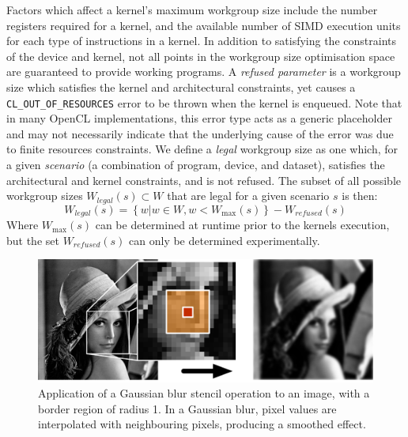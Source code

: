 \documentclass[nonatbib,preprint,9pt]{sigplanconf}
\begin{document}
Factors which affect a kernel's maximum workgroup size include the
number registers required for a kernel, and the available number of
SIMD execution units for each type of instructions in a kernel. In
addition to satisfying the constraints of the device and kernel, not
all points in the workgroup size optimisation space are guaranteed to
provide working programs. A \emph{refused parameter} is a workgroup
size which satisfies the kernel and architectural constraints, yet
causes a \texttt{CL\_OUT\_OF\_RESOURCES} error to be thrown when the
kernel is enqueued. Note that in many OpenCL implementations, this
error type acts as a generic placeholder and may not necessarily
indicate that the underlying cause of the error was due to finite
resources constraints. We define a \emph{legal} workgroup size as one
which, for a given \emph{scenario} (a combination of program, device,
and dataset), satisfies the architectural and kernel constraints, and
is not refused. The subset of all possible workgroup sizes
$W_{legal}(s) \subset W$ that are legal for a given scenario $s$ is
then:
%
\begin{equation}
  W_{legal}(s) = \left\{w | w \in W, w < W_{\max}(s) \right\} - W_{refused}(s)
\end{equation}
%
Where $W_{\max}(s)$ can be determined at runtime prior to the kernels
execution, but the set $W_{refused}(s)$ can only be determined
experimentally.


\begin{figure}
\centering
\includegraphics[width=.98\columnwidth]{img/lena-stencil.pdf}
\caption{%
  Application of a Gaussian blur stencil operation to an image, with a
  border region of radius 1. In a Gaussian blur, pixel values are
  interpolated with neighbouring pixels, producing a smoothed effect.%
}
\label{fig:stencil-img}
\end{figure}
\end{document}
